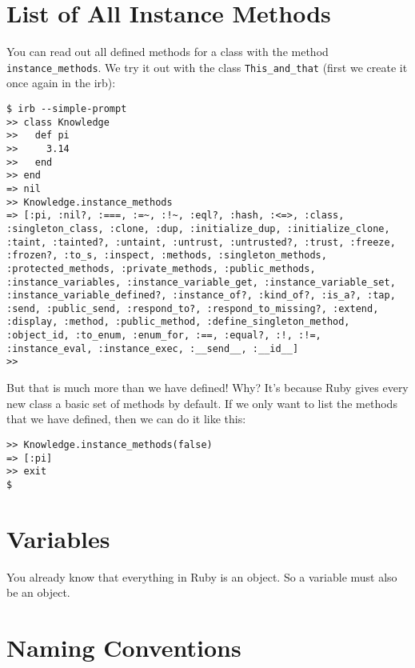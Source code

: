 \documentclass[a4paper]{book}
\begin{document}
\section{List of All Instance Methods}\label{list-of-all-instance-methods}

You can read out all defined methods for a class with the method \texttt{instance\_methods}. We try it out with the class \texttt{This\_and\_that} (first we create it once again in the irb):

\begin{shaded}\begin{verbatim}
$ irb --simple-prompt
>> class Knowledge
>>   def pi
>>     3.14
>>   end
>> end
=> nil
>> Knowledge.instance_methods
=> [:pi, :nil?, :===, :=~, :!~, :eql?, :hash, :<=>, :class, :singleton_class, :clone, :dup, :initialize_dup, :initialize_clone, :taint, :tainted?, :untaint, :untrust, :untrusted?, :trust, :freeze, :frozen?, :to_s, :inspect, :methods, :singleton_methods, :protected_methods, :private_methods, :public_methods, :instance_variables, :instance_variable_get, :instance_variable_set, :instance_variable_defined?, :instance_of?, :kind_of?, :is_a?, :tap, :send, :public_send, :respond_to?, :respond_to_missing?, :extend, :display, :method, :public_method, :define_singleton_method, :object_id, :to_enum, :enum_for, :==, :equal?, :!, :!=, :instance_eval, :instance_exec, :__send__, :__id__]
>>
\end{verbatim}\end{shaded}

But that is much more than we have defined! Why? It's because Ruby gives every new class a basic set of methods by default. If we only want to list the methods that we have defined, then we can do it like this:

\begin{shaded}\begin{verbatim}
>> Knowledge.instance_methods(false)
=> [:pi]
>> exit
$
\end{verbatim}\end{shaded}

\section{Variables}\label{variables}

You already know that everything in Ruby is an object. So a variable must also be an object.

\section{Naming Conventions}\label{naming-conventions}
\end{document}
